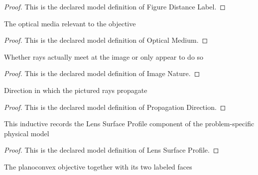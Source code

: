 \begin{proof}
  This is the declared model definition of Figure Distance Label.
\end{proof}
\begin{definition}
  \label{def:physics:phyx-mini-0057:phyxminiproblems-problemphyxmini0057-opticalmedium}
  The optical media relevant to the objective
\end{definition}
\begin{proof}
  This is the declared model definition of Optical Medium.
\end{proof}
\begin{definition}
  \label{def:physics:phyx-mini-0057:phyxminiproblems-problemphyxmini0057-imagenature}
  Whether rays actually meet at the image or only appear to do so
\end{definition}
\begin{proof}
  This is the declared model definition of Image Nature.
\end{proof}
\begin{definition}
  \label{def:physics:phyx-mini-0057:phyxminiproblems-problemphyxmini0057-propagationdirection}
  Direction in which the pictured rays propagate
\end{definition}
\begin{proof}
  This is the declared model definition of Propagation Direction.
\end{proof}
\begin{definition}
  \label{def:physics:phyx-mini-0057:phyxminiproblems-problemphyxmini0057-lenssurfaceprofile}
  This inductive records the Lens Surface Profile component of the problem-specific physical model
\end{definition}
\begin{proof}
  This is the declared model definition of Lens Surface Profile.
\end{proof}
\begin{definition}
  \label{def:physics:phyx-mini-0057:phyxminiproblems-problemphyxmini0057-planoconvexobjective}
  The planoconvex objective together with its two labeled faces
\end{definition}
